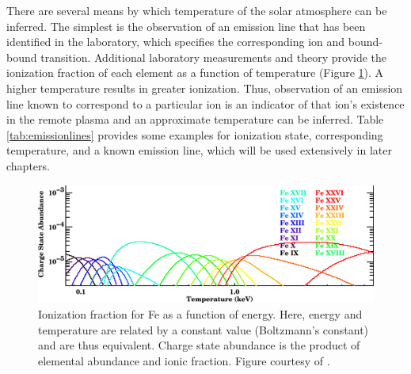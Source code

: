 There are several means by which temperature of the solar atmosphere can be inferred. The simplest is the observation of an emission line that has been identified in the laboratory, which specifies the corresponding ion and bound-bound transition. Additional laboratory measurements and theory provide the ionization fraction of each element as a function of temperature (Figure \ref{fig:feionizationfraction}). A higher temperature results in greater ionization. Thus, observation of an emission line known to correspond to a particular ion is an indicator of that ion's existence in the remote plasma and an approximate temperature can be inferred. Table \ref{tab:emissionlines} provides some examples for ionization state, corresponding temperature, and a known emission line, which will be used extensively in later chapters. 

\begin{figure}[!h]
    \begin{center}
	    \includegraphics[width=120mm]{Images/FeIonizationFraction.png}
    \end{center}
    \caption[Fe ionization fraction]{
        Ionization fraction for Fe as a function of energy. Here, energy and temperature are related by a constant value 
        (Boltzmann's constant) and are thus equivalent. Charge state abundance is the product of elemental abundance and 
        ionic fraction. Figure courtesy of \citet{Peterson2006}. 
    }
    \label{fig:feionizationfraction}
\end{figure}

